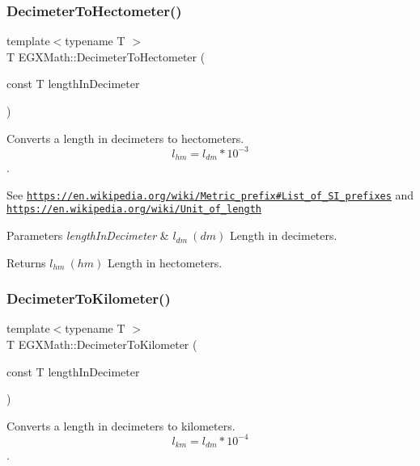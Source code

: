 \subsubsection{\texorpdfstring{Decimeter\+To\+Hectometer()}{DecimeterToHectometer()}}
{\footnotesize\ttfamily template$<$typename T $>$ \\
T E\+G\+X\+Math\+::\+Decimeter\+To\+Hectometer (\begin{DoxyParamCaption}\item[{const T}]{length\+In\+Decimeter }\end{DoxyParamCaption})}



Converts a length in decimeters to hectometers. \[ l_{hm}=l_{dm} * 10^{-3} \]. 

See \href{https://en.wikipedia.org/wiki/Metric_prefix#List_of_SI_prefixes}{\tt https\+://en.\+wikipedia.\+org/wiki/\+Metric\+\_\+prefix\#\+List\+\_\+of\+\_\+\+S\+I\+\_\+prefixes} and \href{https://en.wikipedia.org/wiki/Unit_of_length}{\tt https\+://en.\+wikipedia.\+org/wiki/\+Unit\+\_\+of\+\_\+length} 
\begin{DoxyParams}{Parameters}
{\em length\+In\+Decimeter} & $ l_{dm}\ (dm)$ Length in decimeters. \\
\hline
\end{DoxyParams}
\begin{DoxyReturn}{Returns}
$ l_{hm}\ (hm)$ Length in hectometers. 
\end{DoxyReturn}
\mbox{\label{group___e_g_x_math-_conversions-_length_conversions-_s_i-_decimeter-_s_i_gaad90a14189b6602a87b449adb1cd5e82}} 
\subsubsection{\texorpdfstring{Decimeter\+To\+Kilometer()}{DecimeterToKilometer()}}
{\footnotesize\ttfamily template$<$typename T $>$ \\
T E\+G\+X\+Math\+::\+Decimeter\+To\+Kilometer (\begin{DoxyParamCaption}\item[{const T}]{length\+In\+Decimeter }\end{DoxyParamCaption})}



Converts a length in decimeters to kilometers. \[ l_{km}=l_{dm} * 10^{-4} \]. 

